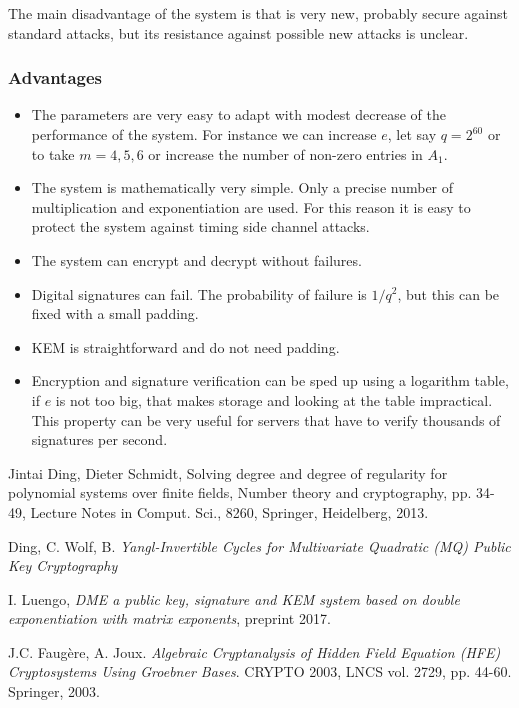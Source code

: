 \documentclass[12pt,a4paper]{amsart}
\theoremstyle{remark}
\theoremstyle{definition}
\begin{document}
The main disadvantage of the system is that is very new, probably secure against standard attacks, 
but its resistance against possible new attacks is unclear.

\subsubsection*{Advantages}
\begin{itemize}
 \item The parameters are very easy to adapt with modest decrease of the performance of the system. 
 For instance we can increase $e$, let say $q=2^{60}$ or to take $m=4,5,6$ or increase the number of non-zero entries in $A_1$.
 \item The system is mathematically very simple. Only a precise number of multiplication and exponentiation are used. 
 For this reason it is easy to protect the system against timing side channel attacks.
 \item The system can encrypt and decrypt without failures. 
 \item Digital signatures can fail. The probability of failure is $1/q^2$, but this can be fixed with a small padding.
 \item KEM is straightforward and do not need padding.
 \item Encryption and signature verification can be sped up using a logarithm table, if $e$ is not too big, that makes storage   
 and looking at the table impractical. This property can be very useful for servers that have to verify thousands of signatures per second. 
\end{itemize}


\begin{thebibliography}{15}

Jintai Ding, Dieter Schmidt, Solving degree and degree of regularity for
polynomial systems over finite fields, Number theory and cryptography, pp.
34-49, Lecture Notes in Comput. Sci., 8260, Springer, Heidelberg, 2013.

Ding, C. Wolf, B. \emph{Yangl-Invertible Cycles for Multivariate Quadratic (MQ) Public Key Cryptography}

I. Luengo, \emph{DME a  public key, signature and KEM system based on double exponentiation  with matrix exponents}, preprint 2017.

J.C. Faug\`ere, A. Joux. \emph{Algebraic Cryptanalysis of Hidden Field
Equation (HFE) Cryptosystems Using Groebner Bases}. CRYPTO 2003, LNCS
vol. 2729, pp. 44-60. Springer, 2003.

\end{thebibliography}
\end{document}
